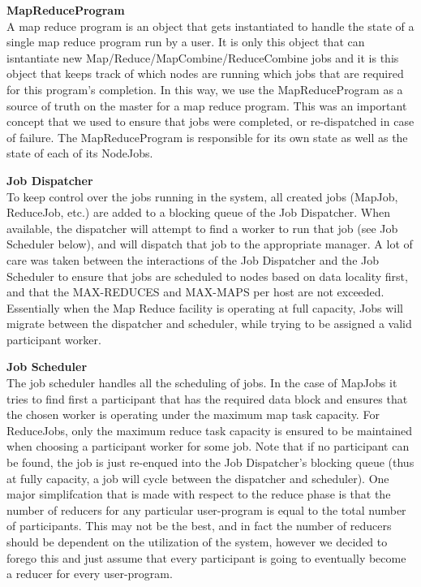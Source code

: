 \documentclass[11pt]{article}
\begin{document}
\textbf{MapReduceProgram}
\\ A map reduce program is an object that gets instantiated to handle the state of a single map reduce program run by a user. It is only this object that can isntantiate new Map/Reduce/MapCombine/ReduceCombine jobs and it is this object that keeps track of which nodes are running which jobs that are required for this program's completion. In this way, we use the MapReduceProgram as a source of truth on the master for a map reduce program. This was an important concept that we used to ensure that jobs were completed, or re-dispatched in case of failure. The MapReduceProgram is responsible for its own state as well as the state of each of its NodeJobs.

\textbf{Job Dispatcher}
\\ To keep control over the jobs running in the system, all created jobs (MapJob, ReduceJob, etc.) are added to a blocking queue of the Job Dispatcher. When available, the dispatcher will attempt to find a worker to run that job (see Job Scheduler below), and will dispatch that job to the appropriate manager. A lot of care was taken between the interactions of the Job Dispatcher and the Job Scheduler to ensure that jobs are scheduled to nodes based on data locality first, and that the MAX-REDUCES and MAX-MAPS per host are not exceeded. Essentially when the Map Reduce facility is operating at full capacity, Jobs will migrate between the dispatcher and scheduler, while trying to be assigned a valid participant worker.

\textbf{Job Scheduler}
\\ The job scheduler handles all the scheduling of jobs. In the case of MapJobs it tries to find first a participant that has the required data block and ensures that the chosen worker is operating under the maximum map task capacity. For ReduceJobs, only the maximum reduce task capacity is ensured to be maintained when choosing a participant worker for some job. Note that if no participant can be found, the job is just re-enqued into the Job Dispatcher's blocking queue (thus at fully capacity, a job will cycle between the dispatcher and scheduler). One major simplifcation that is made with respect to the reduce phase is that the number of reducers for any particular user-program is equal to the total number of participants. This may not be the best, and in fact the number of reducers should be dependent on the utilization of the system, however we decided to forego this and just assume that every participant is going to eventually become a reducer for every user-program.
\end{document}
